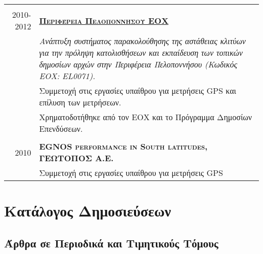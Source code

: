 \documentclass[a4paper,10pt]{article} %
\begin{document}
\begin{longtable}{r|p{13cm}}
\multicolumn{2}{c}{}\\
\textsc{2010-2012} & \textbf{\textsc{\href{http://www.landslides.gr/index.php?lang=el}{Περιφέρεια Πελοποννήσου ΕΟΧ}}}\\
  & \textit{Ανάπτυξη συστήματος παρακολούθησης της αστάθειας κλιτύων για την πρόληψη κατολισθήσεων και εκπαίδευση των τοπικών δημοσίων αρχών στην Περιφέρεια Πελοποννήσου (Κωδικός ΕΟΧ: EL0071).}\\
  & Συμμετοχή στις εργασίες υπαίθρου για μετρήσεις GPS και επίλυση των μετρήσεων.\\
  & Χρηματοδοτήθηκε από τον ΕΟΧ και το Πρόγραμμα Δημοσίων Επενδύσεων.\\

\multicolumn{2}{c}{}\\
\textsc{2010} & \textbf{\textsc{EGNOS performance in South latitudes, ΓΕΩΤΟΠΟΣ Α.Ε.}}\\
  & Συμμετοχή στις εργασίες υπαίθρου για μετρήσεις GPS\\

\end{longtable}
\medskip

\section{Κατάλογος Δημοσιεύσεων}
\medskip

\subsection*{Άρθρα σε Περιοδικά και Τιμητικούς Τόμους}
\end{document}
